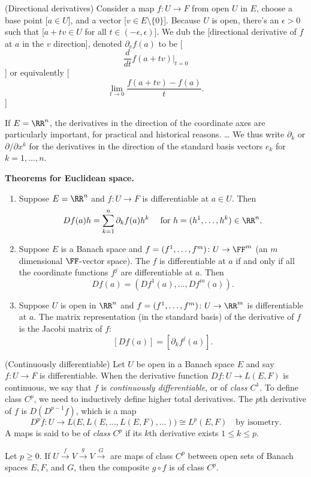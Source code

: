 (Directional derivatives) Consider a map $f \colon U \to F$ from open $U$ in $E$, choose a base point [$a \in U$], and a vector [$v \in E \setminus \{0\}$]. Because $U$ is open, there's an $\epsilon > 0$ such that [$a +tv \in U$ for all $t \in (-\epsilon, \epsilon)$]. We dub the [directional derivative of $f$ at $a$ in the $v$ direction], denoted $\partial_v f(a)$ to be [$$\frac{d}{dt} f(a + tv)\lvert_{t=0}$$] or equivalently [$$\lim_{t \to 0 } \frac{f(a + tv) - f(a)}{t}.$$]

If $E = \RR^n$, the derivatives in the direction of the coordinate
axes are particularly important, for practical and historical reasons.
\ldots{} We thus write $\partial_k$ or $\partial/\partial x^k$ for
the derivatives in the direction of the standard basis vectors $e_k$
for $k = 1, \ldots,n$.

\textbf{Theorems for Euclidean space.}

\begin{enumerate}
\item
  Suppose $E = \RR^n$ and $f \colon U \to F$ is differentiable at
  $a \in U$. Then
  $$Df(a) h = \sum_{k =1}^n \partial_k f(a)h^k\quad \text{ for $h = (h^1, \ldots, h^k) \in \RR^n.$}$$
\item
  Suppose $E$ is a Banach space and
  $f = (f^1, \ldots, f^m) \colon U \to \FF^m$ (an $m$ dimensional
  $\FF$-vector space). The $f$ is differentiable at $a$ if and
  only if all the coordinate functions $f^j$ are differentiable at
  $a$. Then $$Df(a) = (Df^1(a), \ldots, Df^m(a)).$$
\item
  Suppose $U$ is open in $\RR^n$ and
  $f = (f^1, \ldots, f^m) \colon U \to \RR^m$ is differentiable at
  $a$. The matrix representation (in the standard basis) of the
  derivative of $f$ is the Jacobi matrix of $f$:
  $$[Df(a)] = [\partial_k f^j(a)].$$
\end{enumerate}

(Continuously differentiable) Let $U$ be open in a Banach space $E$ and say $f \colon U \to F$ is differentiable. When the derivative function $Df \colon U \to L(E, F)$ is continuous, we say that $f$ is \emph{continuously differentiable}, or of \emph{class $C^1$}. To define class $C^p$, we need to inductively define higher total derivatives. The $p$th derivative of $f$ is $D(D^{p-1}f)$, which is a map $$D^p f \colon U \to L\big(E, L(E, \ldots, L(E,F), \ldots )\big) \cong L^p(E, F) \quad \text{by isometry.}$$ A maps is said to be of \emph{class $C^p$} if its $k$th derivative exists $1 \le k \le p$.

Let $p \ge 0$. If $U \xrightarrow{f} V \xrightarrow{g} V \xrightarrow G$ are maps of class $C^p$ between open sets of Banach spaces $E, F$, and $G$, then the composite $g \circ f$ is of class $C^p$.
